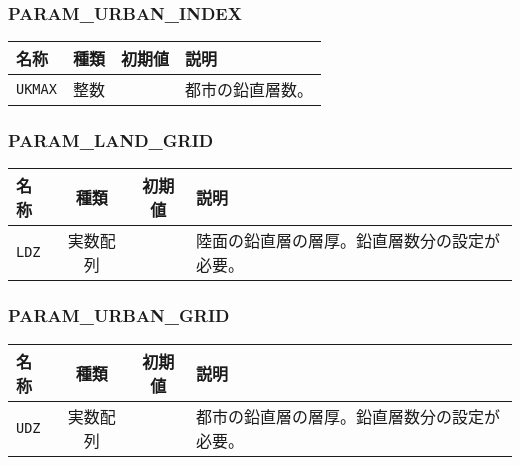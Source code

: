 \subsubsection{PARAM\_URBAN\_INDEX}
\begin{tabularx}{150mm}{|l|c|c|X|} \hline
 \rowcolor[gray]{0.9} 名称 & 種類 & 初期値 & 説明 \\ \hline
 \verb|UKMAX| & 整数 &  & 都市の鉛直層数。 \\ \hline
\end{tabularx}


\subsubsection{PARAM\_LAND\_GRID}
\begin{tabularx}{150mm}{|l|c|c|X|} \hline
 \rowcolor[gray]{0.9} 名称 & 種類 & 初期値 & 説明 \\ \hline
 \verb|LDZ| & 実数配列 &  & 陸面の鉛直層の層厚。鉛直層数分の設定が必要。 \\ \hline
\end{tabularx}


\subsubsection{PARAM\_URBAN\_GRID}
\begin{tabularx}{150mm}{|l|c|c|X|} \hline
 \rowcolor[gray]{0.9} 名称 & 種類 & 初期値 & 説明 \\ \hline
 \verb|UDZ| & 実数配列 &  & 都市の鉛直層の層厚。鉛直層数分の設定が必要。 \\ \hline
\end{tabularx}


